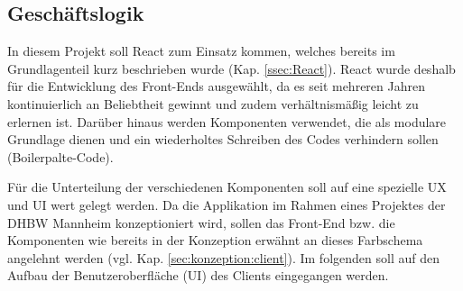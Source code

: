 
\subsection{Geschäftslogik}
\label{ssec:GeschaeftslogikClient}

In diesem Projekt soll React zum Einsatz kommen, welches bereits im Grundlagenteil kurz beschrieben wurde (Kap. \vref{ssec:React}).
React wurde \ua deshalb für die Entwicklung des Front-Ends ausgewählt, da es seit mehreren Jahren kontinuierlich an Beliebtheit gewinnt\autocite[vgl.][]{stackoverflow_Top_Frameworks} und zudem verhältnismäßig leicht zu erlernen ist.
Darüber hinaus werden Komponenten verwendet, die als modulare Grundlage dienen und ein wiederholtes Schreiben des Codes verhindern sollen (Boilerpalte-Code). 

Für die Unterteilung der verschiedenen Komponenten soll auf eine spezielle \ac{UX} und \ac{UI} wert gelegt werden. 
Da die Applikation im Rahmen eines Projektes der DHBW Mannheim konzeptioniert wird, sollen das Front-End bzw. die Komponenten wie bereits in der Konzeption erwähnt an dieses Farbschema angelehnt werden (vgl. Kap. \vref{sec:konzeption:client}). 
Im folgenden soll auf den Aufbau der Benutzeroberfläche (\ac{UI}) des Clients eingegangen werden. 
